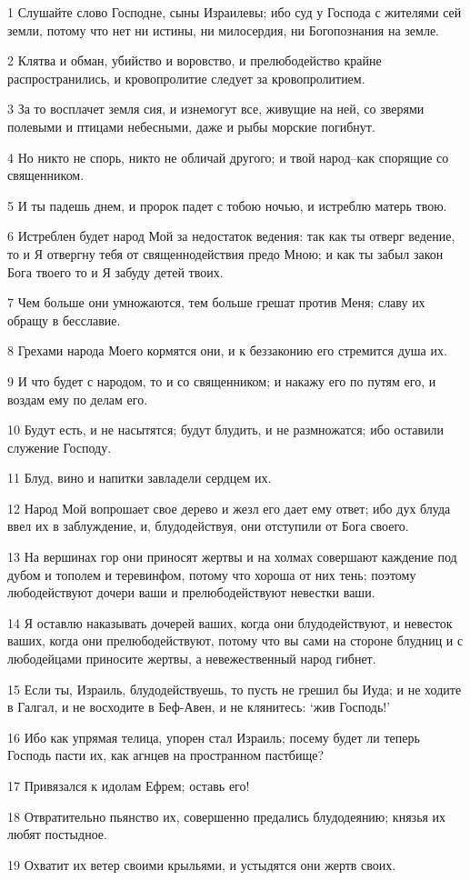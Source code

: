 \par 1 Слушайте слово Господне, сыны Израилевы; ибо суд у Господа с жителями сей земли, потому что нет ни истины, ни милосердия, ни Богопознания на земле.
\par 2 Клятва и обман, убийство и воровство, и прелюбодейство крайне распространились, и кровопролитие следует за кровопролитием.
\par 3 За то восплачет земля сия, и изнемогут все, живущие на ней, со зверями полевыми и птицами небесными, даже и рыбы морские погибнут.
\par 4 Но никто не спорь, никто не обличай другого; и твой народ--как спорящие со священником.
\par 5 И ты падешь днем, и пророк падет с тобою ночью, и истреблю матерь твою.
\par 6 Истреблен будет народ Мой за недостаток ведения: так как ты отверг ведение, то и Я отвергну тебя от священнодействия предо Мною; и как ты забыл закон Бога твоего то и Я забуду детей твоих.
\par 7 Чем больше они умножаются, тем больше грешат против Меня; славу их обращу в бесславие.
\par 8 Грехами народа Моего кормятся они, и к беззаконию его стремится душа их.
\par 9 И что будет с народом, то и со священником; и накажу его по путям его, и воздам ему по делам его.
\par 10 Будут есть, и не насытятся; будут блудить, и не размножатся; ибо оставили служение Господу.
\par 11 Блуд, вино и напитки завладели сердцем их.
\par 12 Народ Мой вопрошает свое дерево и жезл его дает ему ответ; ибо дух блуда ввел их в заблуждение, и, блудодействуя, они отступили от Бога своего.
\par 13 На вершинах гор они приносят жертвы и на холмах совершают каждение под дубом и тополем и теревинфом, потому что хороша от них тень; поэтому любодействуют дочери ваши и прелюбодействуют невестки ваши.
\par 14 Я оставлю наказывать дочерей ваших, когда они блудодействуют, и невесток ваших, когда они прелюбодействуют, потому что вы сами на стороне блудниц и с любодейцами приносите жертвы, а невежественный народ гибнет.
\par 15 Если ты, Израиль, блудодействуешь, то пусть не грешил бы Иуда; и не ходите в Галгал, и не восходите в Беф-Авен, и не клянитесь: `жив Господь!'
\par 16 Ибо как упрямая телица, упорен стал Израиль; посему будет ли теперь Господь пасти их, как агнцев на пространном пастбище?
\par 17 Привязался к идолам Ефрем; оставь его!
\par 18 Отвратительно пьянство их, совершенно предались блудодеянию; князья их любят постыдное.
\par 19 Охватит их ветер своими крыльями, и устыдятся они жертв своих.

